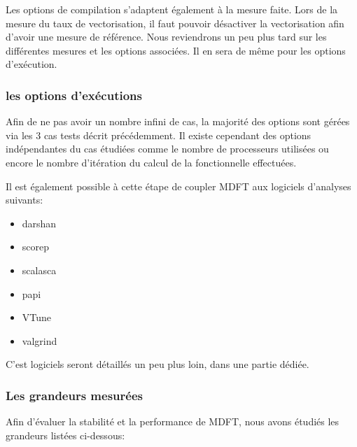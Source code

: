 Les options de compilation s'adaptent également à la mesure faite. Lors de la mesure du taux de vectorisation, il faut pouvoir désactiver la vectorisation afin d'avoir une mesure de référence. Nous reviendrons un peu plus tard sur les différentes mesures et les options associées. Il en sera de même pour les options d'exécution.


\subsubsection{ les options d'exécutions }
Afin de ne pas avoir un nombre infini de cas, la majorité des options sont gérées via les 3 cas tests décrit précédemment. Il existe cependant des options indépendantes du cas étudiées comme le nombre de processeurs utilisées ou encore le nombre d’itération du calcul de la fonctionnelle effectuées.

Il est également possible à cette étape de coupler MDFT aux logiciels d'analyses suivants:
\begin{itemize}
\item darshan
\item scorep
\item scalasca
\item papi
\item VTune
\item valgrind
\end{itemize}
C'est logiciels seront détaillés un peu plus loin, dans une partie dédiée.



\subsubsection{ Les grandeurs mesurées }
Afin d'évaluer la stabilité et la performance de MDFT, nous avons étudiés les grandeurs listées ci-dessous:

